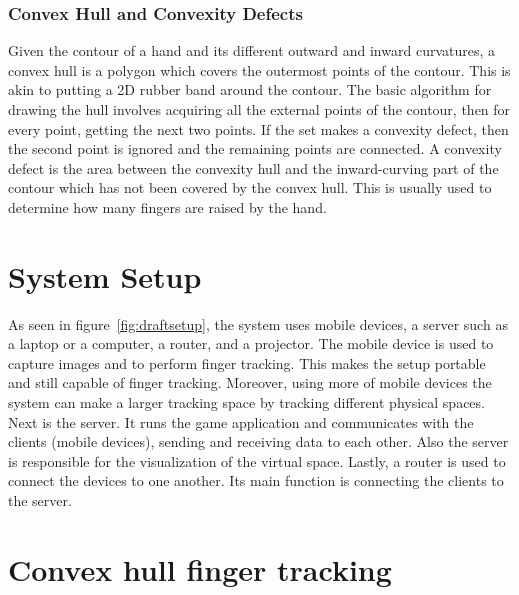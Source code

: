 \documentclass{acm_proc_article-sp}
\begin{document}
\subsubsection{Convex Hull and Convexity Defects}
Given the contour of a hand and its different outward and inward curvatures, a convex hull is a polygon which covers the outermost points of the contour. This is akin to putting a 2D rubber band around the contour. The basic algorithm for drawing the hull involves acquiring all the external points of the contour, then for every point, getting the next two points. If the set makes a convexity defect, then the second point is ignored and the remaining points are connected. A convexity defect is the area between the convexity hull and the inward-curving part of the contour which has not been covered by the convex hull. This is usually used to determine how many fingers are raised by the hand.


\section{System Setup}


	As seen in figure~\ref{fig:draftsetup}, the system uses mobile devices, a server such as a laptop or a computer, a router, and a projector. The mobile device is used to capture images and to perform finger tracking. This makes the setup portable and still capable of finger tracking. Moreover, using more of mobile devices the system can make a larger tracking space by tracking different physical spaces. Next is the server. It runs the game application and communicates with the clients (mobile devices), sending and receiving data to each other. Also the server is responsible for the visualization of the virtual space. Lastly, a router is used to connect the devices to one another. Its main function is connecting the clients to the server.


\section{Convex hull finger tracking}
\end{document}
